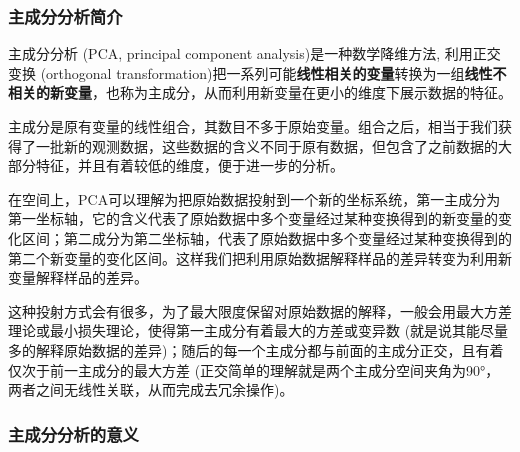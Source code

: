 \documentclass[]{article}
\numberwithin{figure}{section}
\numberwithin{table}{section}
\theoremstyle{definition}
\theoremstyle{definition}
\theoremstyle{definition}
\theoremstyle{remark}
\begin{document}
\subsubsection{主成分分析简介}

主成分分析 (PCA, principal component analysis)是一种数学降维方法,
利用正交变换 (orthogonal
transformation)把一系列可能\textbf{线性相关的变量}转换为一组\textbf{线性不相关的新变量}，也称为主成分，从而利用新变量在更小的维度下展示数据的特征。

主成分是原有变量的线性组合，其数目不多于原始变量。组合之后，相当于我们获得了一批新的观测数据，这些数据的含义不同于原有数据，但包含了之前数据的大部分特征，并且有着较低的维度，便于进一步的分析。

在空间上，PCA可以理解为把原始数据投射到一个新的坐标系统，第一主成分为第一坐标轴，它的含义代表了原始数据中多个变量经过某种变换得到的新变量的变化区间；第二成分为第二坐标轴，代表了原始数据中多个变量经过某种变换得到的第二个新变量的变化区间。这样我们把利用原始数据解释样品的差异转变为利用新变量解释样品的差异。

这种投射方式会有很多，为了最大限度保留对原始数据的解释，一般会用最大方差理论或最小损失理论，使得第一主成分有着最大的方差或变异数
(就是说其能尽量多的解释原始数据的差异)；随后的每一个主成分都与前面的主成分正交，且有着仅次于前一主成分的最大方差
(正交简单的理解就是两个主成分空间夹角为90°，两者之间无线性关联，从而完成去冗余操作)。

\subsubsection{主成分分析的意义}
\end{document}
